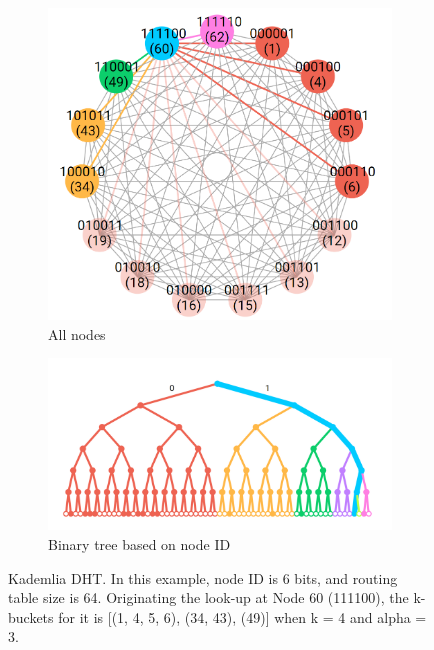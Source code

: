 \begin{figure}[t]
    \centering
    \begin{subfigure}[t]{0.39\textwidth}
        \centering
        \includegraphics[width=\textwidth,trim={0 0 0.5cm 0},clip]{figs/kad_k_bucket.png}
        \caption{All nodes}
    \end{subfigure}
    \begin{subfigure}[t]{0.6\textwidth}
        \centering
        \includegraphics[width=\textwidth,trim={0 -2cm 0 0},clip]{figs/kad_binary_tree.png}
        \caption{Binary tree based on node ID}
    \end{subfigure}
    \caption{Kademlia DHT. In this example, node ID is 6 bits, and routing table size is 64. Originating the look-up at Node 60 (111100), the k-buckets for it is [(1, 4, 5, 6), (34, 43), (49)] when k = 4 and alpha = 3.}
    \label{fig:kad_dht}
\end{figure}

